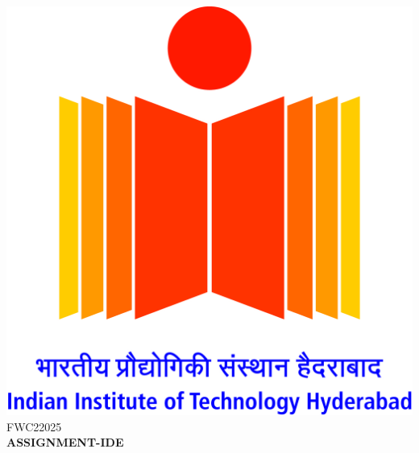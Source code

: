 \documentclass[a4paper,12pt]{report}
\begin{document}
\raggedright{\includegraphics[scale=0.07]{logo.jpg}}\hspace{12.425cm}\raggedleft FWC22025\vspace{2mm}
\\
\centering\Large\textbf{ASSIGNMENT-IDE}\vspace{5mm}
\end{document}
